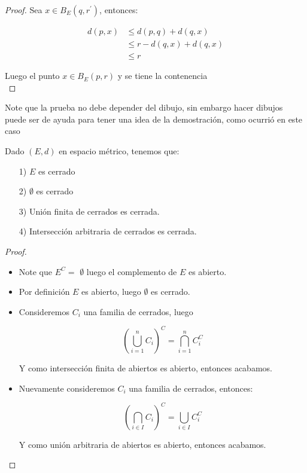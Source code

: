 \begin{itemize}[leftmargin=*]
        \begin{proof}
            Sea $x \in B_E(q,r^{\prime})$, entonces:

            \begin{align*}
                d(p,x)&\leq d(p,q)+d(q,x)\\
                &\leq r-d(q,x)+d(q,x)\\
                &\leq r
            \end{align*}

         Luego el punto $x\in B_E(p,r)$ y se tiene la contenencia\\
        \end{proof} 

Note que la prueba no debe depender del dibujo, sin embargo hacer dibujos puede ser de ayuda para tener una idea de la demostración, como ocurrió en este caso

\begin{theorem}[Teorema 9]

Dado $(E,d)$ en espacio métrico, tenemos que:

\begin{itemize}
\item[1)]$E$ es cerrado

\item[2)] $\emptyset$ es cerrado

\item[3)] Unión finita de cerrados es cerrada.

\item[4)]Intersección arbitraria de cerrados es cerrada.

\end{itemize}
\end{theorem}
\vspace*{0.3cm}
\begin{proof}

\begin{itemize}
\item Note que $E^C=$ $\emptyset$ luego el complemento de $E$ es abierto. 

\item Por definición $E$ es abierto, luego $\emptyset$ es cerrado.

\item Consideremos $C_i$ una familia de cerrados, luego

$$\left(\bigcup_{i=1}^n C_i\right)^C=\bigcap_{i=1}^n C_i^C$$

Y como intersección finita de abiertos es abierto, entonces acabamos.

\item Nuevamente consideremos $C_i$ una familia de cerrados, entonces:

$$\left(\bigcap_{i \in I}C_i\right)^C=\bigcup_{i\in I}C_i^C$$

Y como unión arbitraria de abiertos es abierto, entonces acabamos.

\end{itemize}

\end{proof}



\end{itemize}

